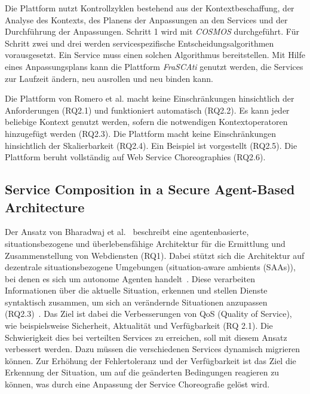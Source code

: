 \documentclass[conference,compsoc,ngerman]{IEEEtran}
\begin{document}
Die Plattform nutzt Kontrollzyklen bestehend aus der Kontextbeschaffung, der Analyse des Kontexts, des Planens der Anpassungen an den Services und der Durchführung der Anpassungen. Schritt 1 wird mit \textit{COSMOS} durchgeführt. Für Schritt zwei und drei werden servicespezifische Entscheidungsalgorithmen vorausgesetzt. Ein Service muss einen solchen Algorithmus bereitstellen. Mit Hilfe eines Anpassungsplans kann die Plattform \textit{FraSCAti} genutzt werden, die Services zur Laufzeit ändern, neu ausrollen und neu binden kann.

Die Plattform von Romero et al. \cite{RRS10} macht keine Einschränkungen hinsichtlich der Anforderungen (RQ2.1) und funktioniert automatisch (RQ2.2). Es kann jeder beliebige Kontext genutzt werden, sofern die notwendigen Kontextoperatoren hinzugefügt werden (RQ2.3). Die Plattform macht keine Einschränkungen hinsichtlich der Skalierbarkeit (RQ2.4). Ein Beispiel ist vorgestellt (RQ2.5). Die Plattform beruht vollständig auf Web Service Choreographies (RQ2.6).

\subsection{Service Composition in a Secure Agent-Based Architecture}
Der Ansatz von Bharadwaj et al.~\cite{bharadwaj2005service} beschreibt eine agentenbasierte, situationsbezogene und überlebensfähige Architektur für die Ermittlung und Zusammenstellung von Webdiensten (RQ1). Dabei stützt sich die Architektur auf dezentrale situationsbezogene Umgebungen (situation-aware ambients (SAAs)), bei denen es sich um autonome Agenten handelt~\cite{bharadwaj2005service}. Diese verarbeiten Informationen über die aktuelle Situation, erkennen und stellen Dienste syntaktisch zusammen, um sich an verändernde Situationen anzupassen (RQ2.3)~\cite{bharadwaj2005service}.
Das Ziel ist dabei die Verbesserungen von QoS (Quality of Service), wie beispielsweise Sicherheit, Aktualität und Verfügbarkeit (RQ 2.1). Die Schwierigkeit dies bei verteilten Services zu erreichen, soll mit diesem Ansatz verbessert werden. Dazu müssen die verschiedenen Services dynamisch migrieren können. Zur Erhöhung der Fehlertoleranz und der Verfügbarkeit ist das Ziel die Erkennung der Situation, um auf die geänderten Bedingungen reagieren zu können, was durch eine Anpassung der Service Choreografie gelöst wird.
\end{document}
